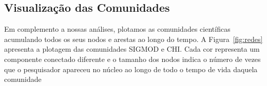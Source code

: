 \documentclass[12pt]{article}
\begin{document}
\subsection{Visualização das Comunidades}

Em complemento a nossas análises, plotamos as comunidades científicas acumulando todos os seus nodos e arestas ao longo 
do tempo. A Figura~\ref{fig:redes} apresenta a plotagem das comunidades SIGMOD e CHI. Cada cor representa um 
componente conectado diferente e o tamanho dos nodos indica o número de vezes que o pesquisador apareceu no núcleo ao 
longo de todo o tempo de vida daquela comunidade


\begin{figure}[!htb]
  \begin{center}
  \subfigure[CHI]{%
    \label{fig:rede_chi}
}
\end{center}
\end{figure}
\end{document}
